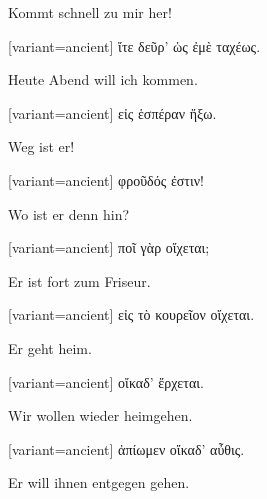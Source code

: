 Kommt schnell zu mir her!

\switchcolumn

\begin{greek}[variant=ancient]%
ἴτε δεῦρ' ὡς ἐμὲ ταχέως.

\end{greek}%
\switchcolumn*

Heute Abend will ich kommen.

\switchcolumn

\begin{greek}[variant=ancient]%
εἰς ἑσπέραν ἥξω.

\end{greek}%
\switchcolumn*

Weg ist er!

\switchcolumn

\begin{greek}[variant=ancient]%
φροῦδός ἐστιν!

\end{greek}%
\switchcolumn*

Wo ist er denn hin?

\switchcolumn

\begin{greek}[variant=ancient]%
ποῖ γὰρ οἴχεται;

\end{greek}%
\switchcolumn*

Er ist fort zum Friseur.

\switchcolumn

\begin{greek}[variant=ancient]%
εἰς τὸ κουρεῖον οἴχεται.

\end{greek}%
\switchcolumn*

Er geht heim.

\switchcolumn

\begin{greek}[variant=ancient]%
οἴκαδ' ἔρχεται.

\end{greek}%
\switchcolumn*

Wir wollen wieder heimgehen.

\switchcolumn

\begin{greek}[variant=ancient]%
ἀπίωμεν οἴκαδ' αὖθις.

\end{greek}%
\switchcolumn*

Er will ihnen entgegen gehen.

\switchcolumn

